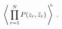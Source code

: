 \begin{equation}
\label{Pcorrelators}
\left\langle \,
\prod\limits_{r=1}^N P(z_r,\bar z_r)\,\right\rangle^{\!\!\!\rm \scriptscriptstyle L} \ .
\end{equation}


